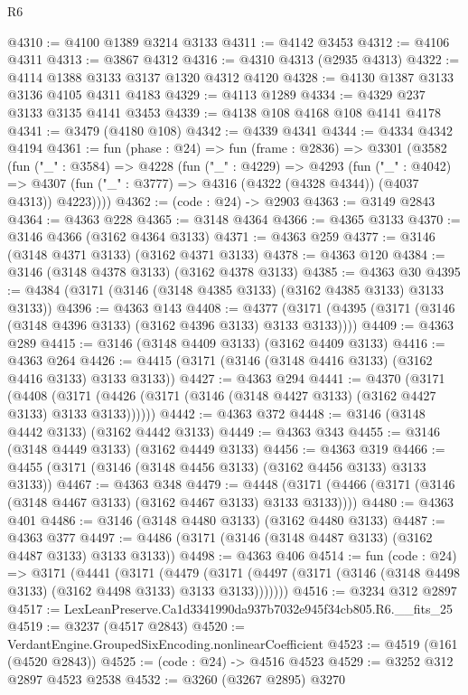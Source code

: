 \begin{lexlean}{R6}
\begin{coremodule}
@4310 := @4100 @1389 @3214 @3133
@4311 := @4142 @3453
@4312 := @4106 @4311
@4313 := @3867 @4312
@4316 := @4310 @4313 (@2935 @4313)
@4322 := @4114 @1388 @3133 @3137 @1320 @4312 @4120
@4328 := @4130 @1387 @3133 @3136 @4105 @4311 @4183
@4329 := @4113 @1289
@4334 := @4329 @237 @3133 @3135 @4141 @3453
@4339 := @4138 @108 @4168 @108 @4141 @4178
@4341 := @3479 (@4180 @108)
@4342 := @4339 @4341
@4344 := @4334 @4342 @4194
@4361 := fun (phase : @24) =>
  fun (frame : @2836) =>
  @3301
    (@3582
      (fun ("_" : @3584) =>
      @4228
        (fun ("_" : @4229) =>
        @4293
          (fun ("_" : @4042) =>
          @4307 (fun ("_" : @3777) => @4316 (@4322 (@4328 @4344)) (@4037 @4313)) @4223))))
@4362 := (code : @24) -> @2903
@4363 := @3149 @2843
@4364 := @4363 @228
@4365 := @3148 @4364
@4366 := @4365 @3133
@4370 := @3146 @4366 (@3162 @4364 @3133)
@4371 := @4363 @259
@4377 := @3146 (@3148 @4371 @3133) (@3162 @4371 @3133)
@4378 := @4363 @120
@4384 := @3146 (@3148 @4378 @3133) (@3162 @4378 @3133)
@4385 := @4363 @30
@4395 := @4384 (@3171 (@3146 (@3148 @4385 @3133) (@3162 @4385 @3133) @3133 @3133))
@4396 := @4363 @143
@4408 := @4377 (@3171 (@4395 (@3171 (@3146 (@3148 @4396 @3133) (@3162 @4396 @3133) @3133 @3133))))
@4409 := @4363 @289
@4415 := @3146 (@3148 @4409 @3133) (@3162 @4409 @3133)
@4416 := @4363 @264
@4426 := @4415 (@3171 (@3146 (@3148 @4416 @3133) (@3162 @4416 @3133) @3133 @3133))
@4427 := @4363 @294
@4441 := @4370
    (@3171
      (@4408 (@3171 (@4426 (@3171 (@3146 (@3148 @4427 @3133) (@3162 @4427 @3133) @3133 @3133))))))
@4442 := @4363 @372
@4448 := @3146 (@3148 @4442 @3133) (@3162 @4442 @3133)
@4449 := @4363 @343
@4455 := @3146 (@3148 @4449 @3133) (@3162 @4449 @3133)
@4456 := @4363 @319
@4466 := @4455 (@3171 (@3146 (@3148 @4456 @3133) (@3162 @4456 @3133) @3133 @3133))
@4467 := @4363 @348
@4479 := @4448 (@3171 (@4466 (@3171 (@3146 (@3148 @4467 @3133) (@3162 @4467 @3133) @3133 @3133))))
@4480 := @4363 @401
@4486 := @3146 (@3148 @4480 @3133) (@3162 @4480 @3133)
@4487 := @4363 @377
@4497 := @4486 (@3171 (@3146 (@3148 @4487 @3133) (@3162 @4487 @3133) @3133 @3133))
@4498 := @4363 @406
@4514 := fun (code : @24) =>
  @3171
    (@4441
      (@3171
        (@4479
          (@3171 (@4497 (@3171 (@3146 (@3148 @4498 @3133) (@3162 @4498 @3133) @3133 @3133)))))))
@4516 := @3234 @312 @2897
@4517 := LexLeanPreserve.Ca1d3341990da937b7032e945f34cb805.R6.__fits_25
@4519 := @3237 (@4517 @2843)
@4520 := VerdantEngine.GroupedSixEncoding.nonlinearCoefficient
@4523 := @4519 (@161 (@4520 @2843))
@4525 := (code : @24) -> @4516 @4523
@4529 := @3252 @312 @2897 @4523 @2538
@4532 := @3260 (@3267 @2895) @3270

\end{coremodule}
\end{lexlean}
